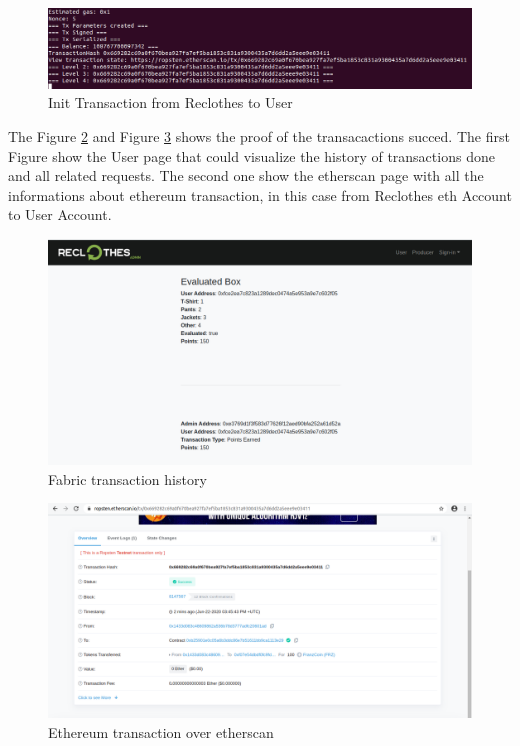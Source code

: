 \begin{figure}[h!]
	\centering
    \includegraphics[totalheight=3cm]{img/test/test1/performed-tx-RU.png}
	\caption{Init Transaction from Reclothes to User}
	\label{fig:tx-reclothes-user}
\end{figure}

The Figure \ref{fig:fabric-tx} and Figure \ref{fig:eth-tx} shows the proof of the transacactions succed. 
The first Figure show the User page that could visualize the history of transactions done and all
related requests. The second one show the etherscan page with all the informations about ethereum
transaction, in this case from Reclothes eth Account to User Account. 

\begin{figure}[h!]
	\centering
    \includegraphics[totalheight=7cm]{img/test/test1/fabrix-tx.png}
	\caption{Fabric transaction history}
	\label{fig:fabric-tx}
\end{figure}

\begin{figure}[h!]
	\centering
    \includegraphics[totalheight=7cm]{img/test/test1/etherscan.png}
	\caption{Ethereum transaction over etherscan}
	\label{fig:eth-tx}
\end{figure}

